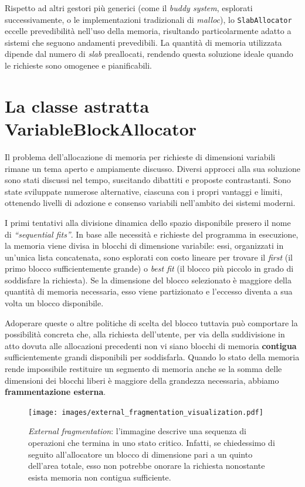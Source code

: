 Rispetto ad altri gestori più generici (come il \textit{buddy system}, esplorati successivamente, o le implementazioni tradizionali di \textit{malloc}), lo \texttt{SlabAllocator} eccelle prevedibilità nell’uso della memoria, risultando particolarmente adatto a sistemi che seguono andamenti prevedibili. La quantità di memoria utilizzata dipende dal numero di \textit{slab} preallocati, rendendo questa soluzione ideale quando le richieste sono omogenee e pianificabili.

\section{La classe astratta VariableBlockAllocator}
Il problema dell’allocazione di memoria per richieste di dimensioni variabili rimane un tema aperto e ampiamente discusso. Diversi approcci alla sua soluzione sono stati discussi nel tempo, suscitando dibattiti e proposte contrastanti. Sono state sviluppate numerose alternative, ciascuna con i propri vantaggi e limiti, ottenendo livelli di adozione e consenso variabili nell'ambito dei sistemi moderni.

I primi tentativi alla divisione dinamica dello spazio disponibile presero il nome di \textit{“sequential fits”}. In base alle necessità e richieste del programma in esecuzione, la memoria viene divisa in blocchi di dimensione variabile: essi, organizzati in un'unica lista concatenata, sono esplorati con costo lineare per trovare il \textit{first} (il primo blocco sufficientemente grande) o \textit{best fit} (il blocco più piccolo in grado di soddisfare la richiesta). Se la dimensione del blocco selezionato è maggiore della quantità di memoria necessaria, esso viene partizionato e l'eccesso diventa a sua volta un blocco disponibile. 

Adoperare queste o altre politiche di scelta del blocco tuttavia può comportare la possibilità concreta che, alla richiesta dell'utente, per via della suddivisione in atto dovuta alle allocazioni precedenti non vi siano blocchi di memoria \textbf{contigua} sufficientemente grandi disponibili per soddisfarla. Quando lo stato della memoria rende impossibile restituire un segmento di memoria anche se la somma delle dimensioni dei blocchi liberi è maggiore della grandezza necessaria, abbiamo \textbf{frammentazione esterna}.

\begin{figure}[H]
    \centering
    \texttt{[image: images/external\_fragmentation\_visualization.pdf]}
    \caption{\textit{External fragmentation}: l'immagine descrive una sequenza di operazioni che termina in uno stato critico. Infatti, se chiedessimo di seguito all'allocatore un blocco di dimensione pari a un quinto dell'area totale, esso non potrebbe onorare la richiesta nonostante esista memoria non contigua sufficiente.}
    \label{fig:external_fragmentation_visualization}
\end{figure}

